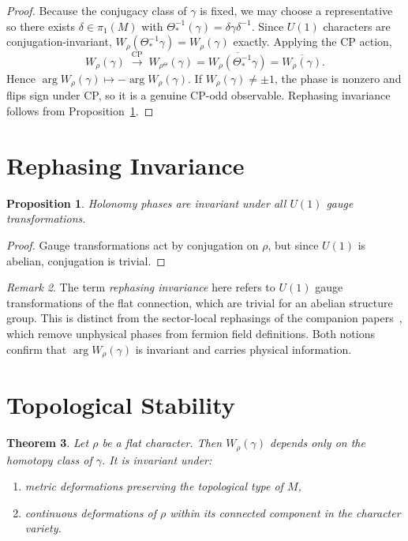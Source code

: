 \documentclass[12pt]{article}
\newtheorem{theorem}{Theorem}[section]
\newtheorem{proposition}[theorem]{Proposition}
\theoremstyle{definition}
\theoremstyle{remark}
\newtheorem{remark}[theorem]{Remark}
\begin{document}
\begin{proof}
Because the conjugacy class of $\gamma$ is fixed, we may choose a representative
so there exists $\delta\in\pi_1(M)$ with $\Theta_*^{-1}(\gamma)=\delta\gamma\delta^{-1}$.
Since $U(1)$ characters are conjugation-invariant,
$W_\rho(\Theta_*^{-1}\gamma) = W_\rho(\gamma)$ exactly.
Applying the CP action,
\[
W_\rho(\gamma) \;\xrightarrow{\text{CP}}\; W_{\rho^\Theta}(\gamma)
= \overline{W_\rho(\Theta_*^{-1}\gamma)} = \overline{W_\rho(\gamma)}.
\]
Hence $\arg W_\rho(\gamma) \mapsto -\arg W_\rho(\gamma)$.
If $W_\rho(\gamma) \neq \pm 1$, the phase is nonzero and flips sign under CP,
so it is a genuine CP-odd observable.  Rephasing invariance follows from
Proposition~\ref{prop:rephasing}.
\end{proof}

\section{Rephasing Invariance}
\label{prop:rephasing}

\begin{proposition}
Holonomy phases are invariant under all $U(1)$ gauge transformations.
\end{proposition}

\begin{proof}
Gauge transformations act by conjugation on $\rho$,
but since $U(1)$ is abelian, conjugation is trivial.
\end{proof}

\begin{remark}
The term \emph{rephasing invariance} here refers to $U(1)$ gauge
transformations of the flat connection, which are trivial for an abelian
structure group.  This is distinct from the sector-local rephasings
of the companion papers~\cite{Gentry:CKM,Gentry:PMNS}, which remove
unphysical phases from fermion field definitions.  Both notions confirm
that $\arg W_\rho(\gamma)$ is invariant and carries physical information.
\end{remark}

\section{Topological Stability}

\begin{theorem}
Let $\rho$ be a flat character.
Then $W_\rho(\gamma)$ depends only on the homotopy class of $\gamma$.
It is invariant under:
\begin{enumerate}
\item metric deformations preserving the topological type of $M$,
\item continuous deformations of $\rho$ within its connected component
in the character variety.
\end{enumerate}
\end{theorem}
\end{document}
